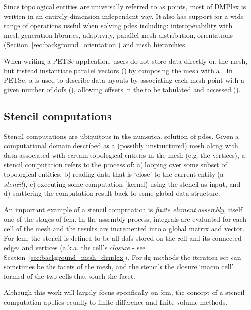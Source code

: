 Since topological entities are universally referred to as points, most of DMPlex is written in an entirely dimension-independent way.
It also has support for a wide range of operations useful when solving \glspl{pde} including: interoperability with mesh generation libraries, adaptivity, parallel mesh distribution, orientations (Section~\ref{sec:background_orientation}) and mesh hierarchies.

When writing a PETSc application, users do not store data directly on the mesh, but instead instantiate parallel vectors () by composing the mesh with a .
In PETSc, a  is used to describe data layouts by associating each mesh point with a given number of \glspl{dof} (), allowing offsets in the  to be tabulated and accessed ().

\subsection{Stencil computations}

Stencil computations are ubiquitous in the numerical solution of \glspl{pde}.
Given a computational domain described as a (possibly unstructured) mesh along with data associated with certain topological entities in the mesh (e.g. the vertices), a stencil computation refers to the process of:
a) looping over some subset of topological entities,
b) reading data that is `close' to the current entity (a \textit{stencil}),
c) executing some computation (kernel) using the stencil as input, and
d) scattering the computation result back to some global data structure.

An important example of a stencil computation is \textit{finite element assembly}, itself one of the stages of \gls{fem}.
In the assembly process, integrals are evaluated for each cell of the mesh and the results are incremented into a global matrix and vector.
For \gls{fem}, the stencil is defined to be all \glspl{dof} stored on the cell and its connected edges and vertices (a.k.a. the cell's \textit{closure} - see Section~\ref{sec:background_mesh_dmplex}).
For \gls{dg} methods the iteration set can sometimes be the facets of the mesh, and the stencils the closure `macro cell' formed of the two cells that touch the facet.

Although this work will largely focus specifically on \gls{fem}, the concept of a stencil computation applies equally to finite difference and finite volume methods.

